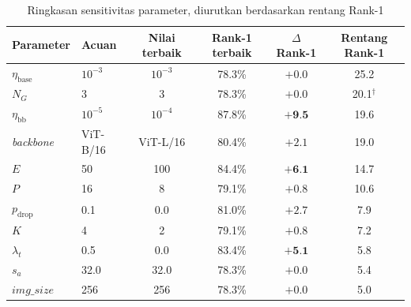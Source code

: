 \begin{table}[htbp]
    \centering
    \caption{Ringkasan sensitivitas parameter, diurutkan berdasarkan rentang Rank-1}
    \label{tab:sensitivity_summary}
    \renewcommand{\arraystretch}{1.2}
    \small
    \begin{tabular}{llcccc}
        \hline
        \textbf{Parameter}   & \textbf{Acuan} & \textbf{Nilai terbaik} & \textbf{Rank-1 terbaik} & \textbf{$\Delta$ Rank-1} & \textbf{Rentang Rank-1}    \\
        \hline
        $\eta_{\text{base}}$ & $10^{-3}$      & $10^{-3}$              & 78.3\%                  & $+0{.}0$                 & 25{.}2                     \\
        $N_G$                & 3              & 3                      & 78.3\%                  & $+0{.}0$                 & 20{.}1$^{\dagger}$         \\
        $\eta_{\text{bb}}$   & $10^{-5}$      & $10^{-4}$              & 87.8\%                  & $\mathbf{+9{.}5}$        & 19{.}6                     \\
        \textit{backbone}    & ViT-B{/}16     & ViT-L{/}16             & 80.4\%                  & $+2{.}1$                 & 19{.}0                     \\
        $E$                  & 50             & 100                    & 84.4\%                  & $\mathbf{+6{.}1}$        & 14{.}7                     \\
        $P$                  & 16             & 8                      & 79.1\%                  & $+0{.}8$                 & 10{.}6                     \\
        $p_{\text{drop}}$    & 0{.}1          & 0{.}0                  & 81.0\%                  & $+2{.}7$                 & 7{.}9                      \\
        $K$                  & 4              & 2                      & 79.1\%                  & $+0{.}8$                 & 7{.}2                      \\
        $\lambda_t$          & 0{.}5          & 0{.}0                  & 83.4\%                  & $\mathbf{+5{.}1}$        & 5{.}8                      \\
        $s_a$                & 32{.}0         & 32{.}0                 & 78.3\%                  & $+0{.}0$                 & 5{.}4                      \\
        $\mathit{img\_size}$ & 256            & 256                    & 78.3\%                  & $+0{.}0$                 & 5{.}0                      \\

\end{tabular}
\end{table}
